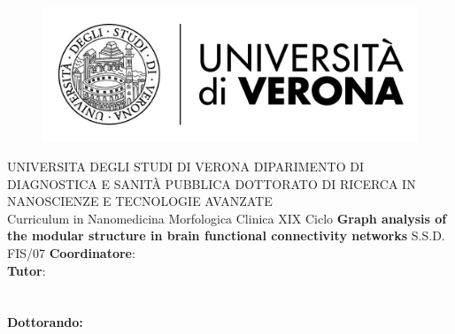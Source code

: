 
\begin{titlepage}
    \begin{figure}[!h]
    \flushleft
	\includegraphics[width=0.25\columnwidth]{images/univr.png}
	\end{figure}

    \begin{center}
    	\large
        UNIVERSITA DEGLI STUDI DI VERONA
        \hfill
        \vfill
		DIPARIMENTO DI DIAGNOSTICA E SANIT\`A PUBBLICA
		\vfill
		DOTTORATO DI RICERCA IN NANOSCIENZE E TECNOLOGIE AVANZATE\\Curriculum in Nanomedicina Morfologica Clinica
		\vfill
		XIX Ciclo
		\vfill
        \begingroup
       		\huge\textbf{
            Graph analysis of the modular structure in brain functional connectivity networks
            }
            \bigskip
        \endgroup
        \vfill
        S.S.D. FIS/07
		\flushleft 
		\normalsize{\textbf{Coordinatore}:}\\
		\flushleft
		\normalsize{\textbf{Tutor}:}\\
		\\
		\\
        \vfill  
        \flushright
        \normalsize{\textbf{Dottorando:}}\\
        \\	
		\vfill

    \end{center}  
\end{titlepage}


